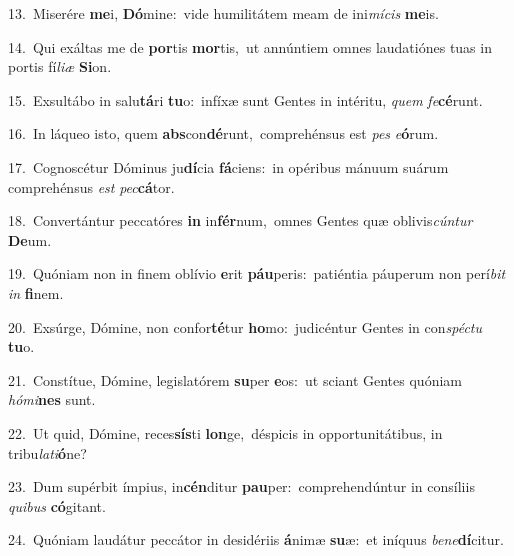 {\numbfont\textcolor{\numbcolor}{13.}}~Miserére \textbf{me}\-i, \textbf{Dó}\-mine:~\star vide humilitátem meam de ini\-\textit{mí}\-\textit{cis} \textbf{me}\-is.\par
{\numbfont\textcolor{\numbcolor}{14.}}~Qui exáltas me de \textbf{por}\-tis \textbf{mor}\-tis,~\star ut annúntiem omnes laudatiónes tuas in portis fí\-\textit{li}\-\textit{æ} \textbf{Si}\-on.\par
{\numbfont\textcolor{\numbcolor}{15.}}~Exsultábo in salu\-\textbf{tá}\-ri \textbf{tu}\-o:~\star infíxæ sunt Gentes in intéritu, \textit{quem} \textit{fe}\-\textbf{cé}runt.\par
{\numbfont\textcolor{\numbcolor}{16.}}~In láqueo isto, quem \textbf{abs}\-con\-\textbf{dé}\-runt,~\star comprehénsus est \textit{pes} \textit{e}\-\textbf{ó}rum.\par
{\numbfont\textcolor{\numbcolor}{17.}}~Cognoscétur Dóminus ju\-\textbf{dí}\-cia \textbf{fá}\-ciens:~\star in opéribus mánuum suárum comprehénsus \textit{est} \textit{pec}\-\textbf{cá}tor.\par
{\numbfont\textcolor{\numbcolor}{18.}}~Convertántur peccatóres \textbf{in} in\-\textbf{fér}\-num,~\star omnes Gentes quæ oblivis\-\textit{cún}\-\textit{tur} \textbf{De}\-um.\par
{\numbfont\textcolor{\numbcolor}{19.}}~Quóniam non in finem oblívio \textbf{e}\-rit \textbf{páu}\-peris:~\star patiéntia páuperum non perí\textit{bit} \textit{in} \textbf{fi}\-nem.\par
{\numbfont\textcolor{\numbcolor}{20.}}~Exsúrge, Dómine, non confor\-\textbf{té}\-tur \textbf{ho}\-mo:~\star judicéntur Gentes in con\-\textit{spéc}\-\textit{tu} \textbf{tu}\-o.\par
{\numbfont\textcolor{\numbcolor}{21.}}~Constítue, Dómine, legislatórem \textbf{su}\-per \textbf{e}\-os:~\star ut sciant Gentes quóniam \textit{hó}\-\textit{mi}\textbf{nes} sunt.\par
{\numbfont\textcolor{\numbcolor}{22.}}~Ut quid, Dómine, reces\-\textbf{sís}\-ti \textbf{lon}\-ge,~\star déspicis in opportunitátibus, in tribu\-\textit{la}\-\textit{ti}\textbf{ó}ne?\par
{\numbfont\textcolor{\numbcolor}{23.}}~Dum supérbit ímpius, in\-\textbf{cén}\-ditur \textbf{pau}\-per:~\star comprehendúntur in consíliis \textit{qui}\-\textit{bus} \textbf{có}\-gitant.\par
{\numbfont\textcolor{\numbcolor}{24.}}~Quóniam laudátur peccátor in desidériis \textbf{á}\-nimæ \textbf{su}\-æ:~\star et iníquus \textit{be}\-\textit{ne}\textbf{dí}citur.\par
